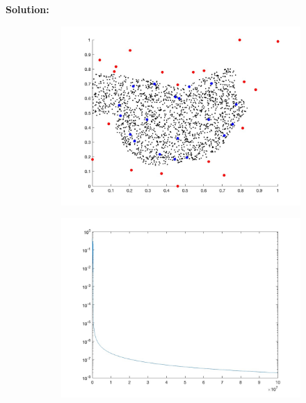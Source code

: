 \documentclass[12pt]{article}
\begin{document}
\begin{enumerate}[label=\bfseries Problem \arabic*:]
\vspace{1em}
\textbf{Solution:}
\begin{figure}[H]
\begin{subfigure}[t!]{.33\textwidth}
   \includegraphics[width=\linewidth]{PS_7_graph_cost.jpg}
\end{subfigure}%
\begin{subfigure}[t!]{.33\textwidth}
  \includegraphics[width=\linewidth]{PS_7_graph_cost_v_time.jpg}
\end{subfigure}%
\begin{subfigure}[t!]{.33\textwidth}

\end{subfigure}
\end{figure}
\end{enumerate}
\end{document}
